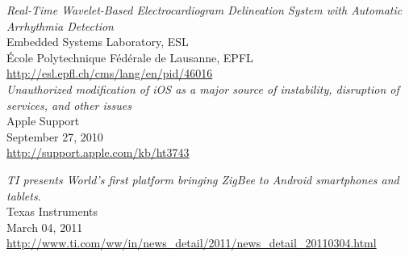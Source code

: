 \begin{thebibliography}{widest-label}

 	\emph{Real-Time Wavelet-Based Electrocardiogram Delineation System with Automatic Arrhythmia Detection}\\
 	Embedded Systems Laboratory, ESL\\
 	École Polytechnique Fédérale de Lausanne, EPFL\\
 	\url{http://esl.epfl.ch/cms/lang/en/pid/46016}\\
	
	\emph{Unauthorized modification of iOS as a major source of instability, disruption of services, and other issues}\\
	Apple Support\\
	September 27, 2010\\
	\url{http://support.apple.com/kb/ht3743}

	\emph{TI presents World’s first platform bringing ZigBee to Android smartphones and tablets}.\\
 	Texas Instruments\\
	March 04, 2011\\
 	\url{http://www.ti.com/ww/in/news_detail/2011/news_detail_20110304.html}\\




\end{thebibliography}
